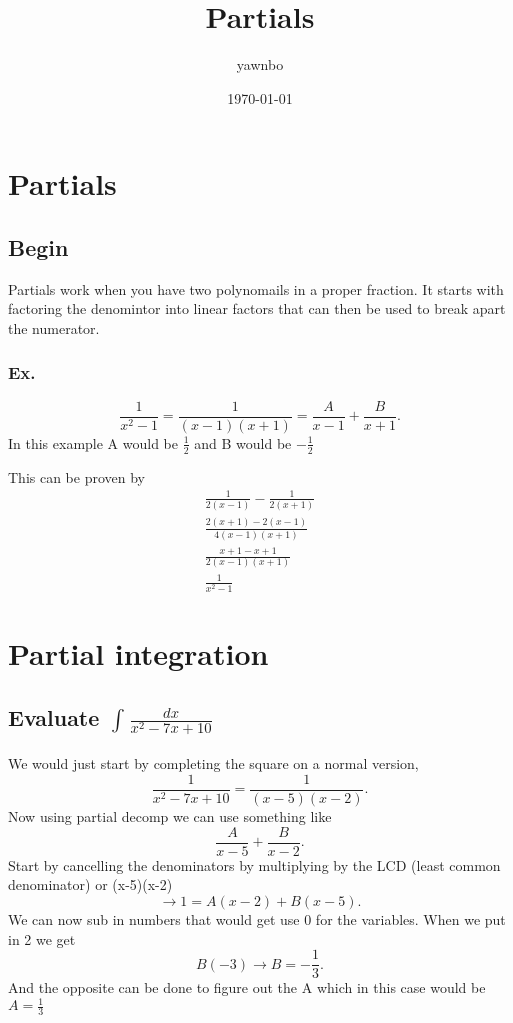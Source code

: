 \documentclass[a4paper]{article}
\title{Partials}
\author{yawnbo}
\date{\today}
\begin{document}
\section{Partials}%
\label{sec:Partials}
\subsection{Begin}%
\label{sub:Begin}

Partials work when you have two polynomails in a proper fraction. It starts with factoring the denomintor into linear factors that can then be used to break apart the numerator. 

\subsubsection{Ex.}%
\label{sub:Ex.}

\[
\frac{1}{x^2-1}=\frac{1}{(x-1)(x+1)}=\frac{A}{x-1}+\frac{B}{x+1}
.\] 
In this example A would be $\frac{1}{2}$ and B would be $-\frac{1}{2}$ 

This can be proven by 
\begin{gather*}
\frac{1}{2(x-1)}-\frac{1}{2(x+1)} \\
\frac{2(x+1)-2(x-1)}{4(x-1)(x+1)} \\
\frac{x+1-x+1}{2(x-1)(x+1)} \\
\frac{1}{x^2-1}
\end{gather*}

\section{Partial integration}%
\label{sec:Partial integration}

\subsection{Evaluate $\int_{}^{} \frac{dx}{x^2-7x+10} $}%

We would just start by completing the square on a normal version,
\[
\frac{1}{x^2-7x+10}=\frac{1}{(x-5)(x-2)}
.\] 
Now using partial decomp we can use something like 
\[
  \frac{A}{x-5}+\frac{B}{x-2}
.\] 
Start by cancelling the denominators by multiplying by the LCD (least common denominator) or (x-5)(x-2)
\newpage
\[
  \to 1=A(x-2)+B(x-5)
.\] 
We can now sub in numbers that would get use 0 for the variables. When we put in 2 we get
\[
B(-3) \to B=-\frac{1}{3}
.\] 
And the opposite can be done to figure out the A which in this case would be $A=\frac{1}{3}$ 
\end{document}
